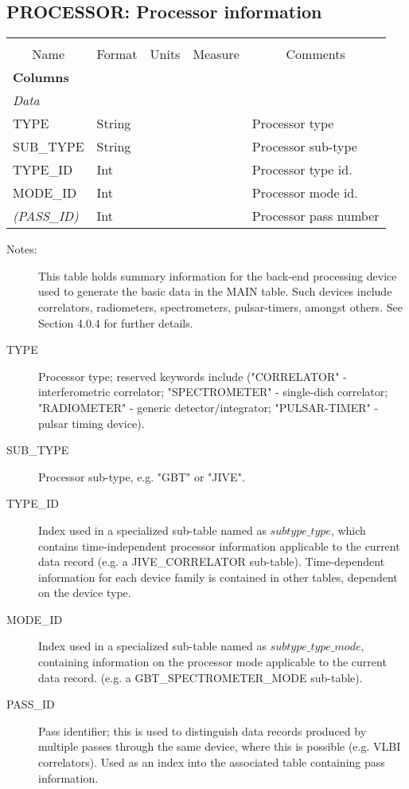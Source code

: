 \documentclass{article}
\newcommand{\defline}[1]{\cline{1-5}
\multicolumn{5}{|l|}{#1} \\
\cline{1-5}}
\newcommand{\definetable}[3][]
{
  \vfill\newpage
  \subsection{#2}
  \label{tbl:#1}
  \vspace{0.15in}
  \small
  \begin{tabular}{|l|p{1.25in}|l|p{.9in}|p{1.4in}|}
  \hline
  \multicolumn{5}{|c|}{\bf #1}\\
  \cline{1-5}
  \multicolumn{1}{|c|}{Name}&\multicolumn{1}{|c|}{Format}&
  \multicolumn{1}{|c|}{Units}&\multicolumn{1}{|c|}{Measure}&
  \multicolumn{1}{|c|}{Comments}\\
  \cline{1-5}
  #3
  \hline
  \end{tabular}
}
\begin{document}
\definetable{PROCESSOR: Processor information}{
\defline{\bf Columns}
\defline{\em Data}
TYPE            & String & & & Processor type \\
SUB\_TYPE & String & & & Processor sub-type\\
TYPE\_ID  & Int & & & Processor type id.\\
MODE\_ID  & Int & & & Processor mode id.\\
{\it (PASS\_ID)}  & Int & & & Processor pass number\\
}
\begin{description}

\item[Notes:] This table holds summary information for the back-end
processing device used to generate the basic data in the MAIN
table. Such devices include correlators, radiometers, spectrometers,
pulsar-timers, amongst others. See Section 4.0.4 for further details.

\item[TYPE] Processor type; reserved keywords include ("CORRELATOR" -
interferometric correlator; "SPECTROMETER" - single-dish correlator;
"RADIOMETER" - generic detector/integrator; "PULSAR-TIMER" - pulsar
timing device).

\item[SUB\_TYPE] Processor sub-type, e.g. "GBT" or "JIVE".

\item[TYPE\_ID] Index used in a specialized sub-table named as
$subtype\_type$, which contains time-independent processor information
applicable to the current data record (e.g. a JIVE\_CORRELATOR
sub-table).  Time-dependent information for each device family is
contained in other tables, dependent on the device type.

\item[MODE\_ID] Index used in a specialized sub-table named as
$subtype\_type\_mode$, containing information on the processor mode
applicable to the current data record. (e.g. a GBT\_SPECTROMETER\_MODE
sub-table).

\item[PASS\_ID] Pass identifier; this is used to distinguish data records
produced by multiple passes through the same device, where this is
possible (e.g. VLBI correlators). Used as an index into the associated
table containing pass information.

\end{description}
\end{document}

